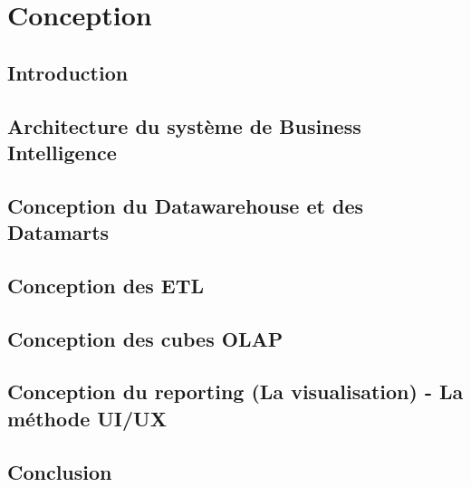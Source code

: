 \chapter{Conception}

\section*{Introduction}%
%
\blindtext

\section{Architecture du système de Business Intelligence}
\blindtext

\section{Conception du Datawarehouse et des Datamarts}
\blindtext

\section{Conception des ETL}
\blindtext

\section{Conception des cubes OLAP}
\blindtext

\section{Conception du reporting (La visualisation) - La méthode UI/UX}
\blindtext

\section*{Conclusion}%
%
\blindtext

